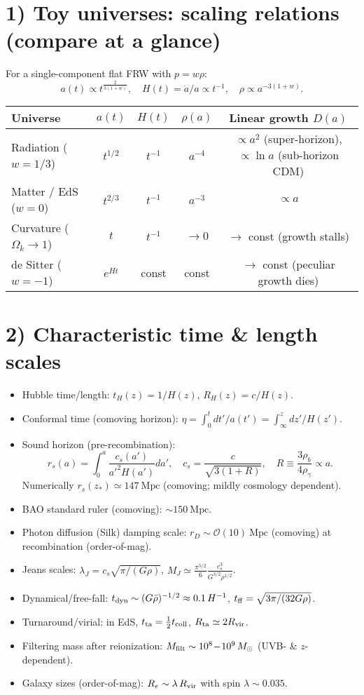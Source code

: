 \documentclass[11pt,a4paper]{article}
\begin{document}
\section*{1) Toy universes: scaling relations (compare at a glance)}
For a single-component flat FRW with $p=w\rho$:
\[
a(t)\propto t^{\frac{2}{3(1+w)}},\quad H(t)=\dot a/a \propto t^{-1},\quad
\rho\propto a^{-3(1+w)}.
\]
\begin{center}
\begin{tabular}{lcccc}
\toprule
\textbf{Universe} & $a(t)$ & $H(t)$ & $\rho(a)$ & Linear growth $D(a)$ \\
\midrule
Radiation ($w=1/3$) & $t^{1/2}$ & $t^{-1}$ & $a^{-4}$ &
$\propto a^2$ (super-horizon), $\propto \ln a$ (sub-horizon CDM) \\
Matter / EdS ($w=0$) & $t^{2/3}$ & $t^{-1}$ & $a^{-3}$ & $\propto a$ \\
Curvature ($\Omega_k\!\to\!1$) & $t$ & $t^{-1}$ & $\to 0$ & $\to$ const (growth stalls) \\
de Sitter ($w=-1$) & $e^{Ht}$ & const & const & $\to$ const (peculiar growth dies) \\
\bottomrule
\end{tabular}
\end{center}

\section*{2) Characteristic time \& length scales}
\begin{itemize}
\item Hubble time/length: $t_H(z)=1/H(z)$,\; $R_H(z)=c/H(z)$.
\item Conformal time (comoving horizon): $\eta=\int_0^t\!dt'/a(t')=\int_\infty^z\!dz'/H(z')$.
\item Sound horizon (pre-recombination):
\[
r_s(a)=\int_0^{a}\frac{c_s(a')}{a'^2 H(a')}da',\quad
c_s=\frac{c}{\sqrt{3(1+R)}},\quad R\equiv \frac{3\rho_b}{4\rho_\gamma}\propto a.
\]
Numerically $r_s(z_\ast)\simeq 147\ \mathrm{Mpc}$ (comoving; mildly cosmology dependent).
\item BAO standard ruler (comoving): $\sim 150\ \mathrm{Mpc}$.
\item Photon diffusion (Silk) damping scale: $r_D\sim \mathcal{O}(10)\ \mathrm{Mpc}$ (comoving) at recombination (order-of-mag).
\item Jeans scales: $\lambda_J=c_s\sqrt{\pi/(G\rho)}$,\;
$M_J\simeq \frac{\pi^{5/2}}{6}\frac{c_s^3}{G^{3/2}\rho^{1/2}}$.
\item Dynamical/free-fall: $t_{\rm dyn}\sim (G\bar\rho)^{-1/2}\approx 0.1\,H^{-1}$,\;
$t_{\rm ff}=\sqrt{3\pi/(32G\rho)}$.
\item Turnaround/virial: in EdS, $t_{\rm ta}=\tfrac{1}{2}t_{\rm coll}$,\; $R_{\rm ta}\simeq 2R_{\rm vir}$.
\item Filtering mass after reionization: $M_{\rm filt}\sim 10^{8}\!-\!10^{9}\,M_\odot$ (UVB- \& $z$-dependent).
\item Galaxy sizes (order-of-mag): $R_e\sim \lambda\,R_{\rm vir}$ with spin $\lambda\sim 0.035$.
\end{itemize}
\end{document}
